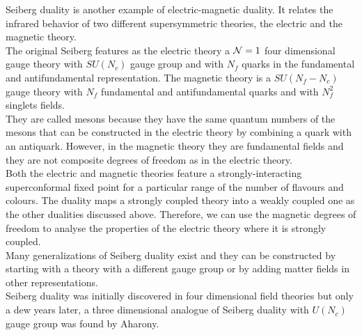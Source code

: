Seiberg duality is another example of electric-magnetic duality.
It relates the infrared behavior of two different supersymmetric theories, the electric and the magnetic theory.\\
The  original Seiberg features as the electric theory a $\mathcal{N}=1$ four dimensional gauge theory with $SU(N_c)$ gauge group and with $N_f$ quarks in the fundamental and antifundamental representation.
The magnetic theory is a $SU(N_f-N_c)$ gauge theory with $N_f$ fundamental and antifundamental quarks and with $N_f^2$ singlets fields. \\
They are called mesons because they have the same quantum numbers of the mesons that can be constructed in the electric theory by combining a quark with an antiquark. 
However, in the magnetic theory they are fundamental fields and they are not composite degrees of freedom as in the electric theory.\\
Both the electric and magnetic theories feature a strongly-interacting superconformal fixed point for a particular range of the number of flavours and colours. 
The duality maps a strongly coupled theory into a weakly coupled one as the other dualities discussed above. 
Therefore, we can use the magnetic degrees of freedom to analyse the properties of the electric theory where it is strongly coupled.\\
Many generalizations of Seiberg duality exist and they can be constructed by starting with a theory with a different gauge group or by adding matter fields in other representations.
\\
Seiberg duality was initially discovered in four dimensional field theories but only a dew years later, a three dimensional analogue of Seiberg duality with $U(N_c)$ gauge group was found by Aharony.\\

